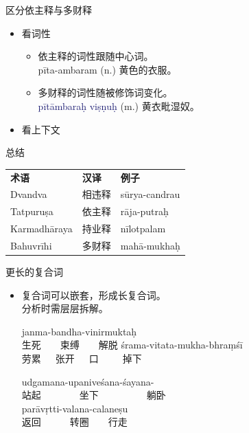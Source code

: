 \documentclass[17pt]{beamer}
\newcommand{\fullpada}[1]{\textcolor{OliveGreen}{#1}}
\newcommand{\fullsentence}[1]{\textcolor{MidnightBlue}{#1}}
\begin{document}
\begin{frame}{区分依主释与多财释}
  \small
  \begin{itemize}
    \item 看词性
    \begin{itemize}
      \item 依主释的词性跟随中心词。\\
        \fullpada{pīta-ambaram} (n.) 黄色的衣服。
      
      \item 多财释的词性随被修饰词变化。\\
        \fullsentence{pītāmbaraḥ viṣṇuḥ} (m.) 黄衣毗湿奴。\\
    \end{itemize}
    \item 看上下文
  \end{itemize}
\end{frame}

\begin{frame}{总结}
  \small
  \centering
  \begin{tabular}{lll}
    \textbf{术语} & \textbf{汉译} & \textbf{例子} \\
    Dvandva & 相违释 & \fullpada{sūrya-candrau} \\
    Tatpuruṣa & 依主释 & \fullpada{rāja-putraḥ} \\
    Karmadhāraya & 持业释 & \fullpada{nīlotpalam} \\
    Bahuvrīhi & 多财释 & \fullpada{mahā-mukhaḥ} \\

  \end{tabular}
\end{frame}

\begin{frame}{更长的复合词}
  \small
  \begin{itemize}
    \item 复合词可以嵌套，形成长复合词。\\分析时需层层拆解。
    \bigskip

    \fullpada{janma\nobreakdash-bandha\nobreakdash-vinirmuktaḥ}\\
    生死~~~~束缚~~~~解脱
    \fullpada{śrama\nobreakdash-vitata\nobreakdash-mukha\nobreakdash-bhraṃśī}\\
    劳累~~~张开~~~口~~~~~掉下\\
    \bigskip

    \fullpada{udgamana\nobreakdash-upaniveśana\nobreakdash-śayana-}\\
    站起~~~~~~~~坐下~~~~~~~~~~躺卧\\
    \fullpada{parāvṛtti\nobreakdash-valana\nobreakdash-calaneṣu}\\
    返回~~~~~~转圈~~~~行走
  \end{itemize}
\end{frame}
\end{document}
